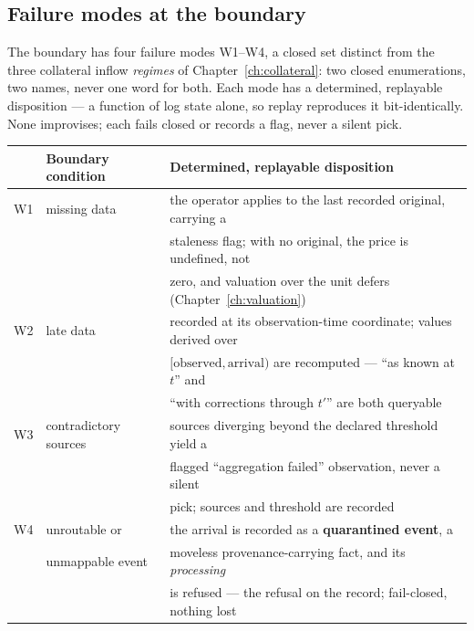 \documentclass[11pt,a4paper]{article}
\begin{document}
\subsection{Failure modes at the boundary}\label{sec:failures}

The boundary has four failure modes W1--W4, a closed set distinct from the three collateral
inflow \emph{regimes} of Chapter~\ref{ch:collateral}: two closed enumerations, two names, never
one word for both. Each mode has a determined, replayable disposition --- a
function of log state alone, so replay reproduces it bit-identically. None improvises; each
fails closed or records a flag, never a silent pick.

\begin{center}
\begin{tabular}{@{}lll@{}}
\toprule
 & Boundary condition & Determined, replayable disposition \\
\midrule
W1 & missing data & the operator applies to the last recorded original, carrying a \\
   &               & staleness flag; with no original, the price is undefined, not \\
   &               & zero, and valuation over the unit defers (Chapter~\ref{ch:valuation}) \\
W2 & late data & recorded at its observation-time coordinate; values derived over \\
   &            & $[\text{observed},\text{arrival})$ are recomputed --- ``as known at $t$'' and \\
   &            & ``with corrections through $t'$'' are both queryable \\
W3 & contradictory sources & sources diverging beyond the declared threshold yield a \\
   &                       & flagged ``aggregation failed'' observation, never a silent \\
   &                       & pick; sources and threshold are recorded \\
W4 & unroutable or & the arrival is recorded as a \textbf{quarantined event}, a \\
   & unmappable event & moveless provenance-carrying fact, and its \emph{processing} \\
   &                  & is refused --- the refusal on the record; fail-closed, nothing lost \\
\bottomrule
\end{tabular}
\end{center}
\end{document}
